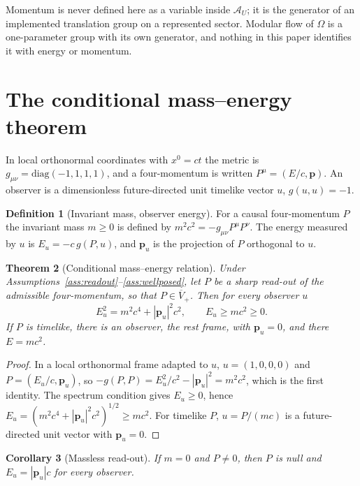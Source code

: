 \documentclass[12pt,a4paper]{article}
\newtheorem{theorem}{Theorem}[section]
\newtheorem{corollary}[theorem]{Corollary}
\theoremstyle{definition}
\newtheorem{definition}[theorem]{Definition}
\theoremstyle{remark}
\newcommand{\AU}{\mathcal{A}_U}
\newcommand{\Omegastate}{\Omega}
\begin{document}
Momentum is never defined here as a variable inside $\AU$; it is the generator of an implemented translation group on a represented sector. Modular flow of $\Omegastate$ is a one-parameter group with its own generator, and nothing in this paper identifies it with energy or momentum.

\section{The conditional mass--energy theorem}
\label{sec:theorem}

In local orthonormal coordinates with $x^0=ct$ the metric is $g_{\mu\nu}=\mathrm{diag}(-1,1,1,1)$, and a four-momentum is written $P^\mu=(E/c,\mathbf p)$. An observer is a dimensionless future-directed unit timelike vector $u$, $g(u,u)=-1$.

\begin{definition}[Invariant mass, observer energy]
\label{def:mass}
For a causal four-momentum $P$ the invariant mass $m\ge0$ is defined by $m^2c^2=-g_{\mu\nu}P^\mu P^\nu$. The energy measured by $u$ is $E_u=-c\,g(P,u)$, and $\mathbf p_u$ is the projection of $P$ orthogonal to $u$.
\end{definition}

\begin{theorem}[Conditional mass--energy relation]
\label{thm:mass-energy}
Under Assumptions~\ref{ass:readout}--\ref{ass:wellposed}, let $P$ be a sharp read-out of the admissible four-momentum, so that $P\in\overline V_+$. Then for every observer $u$
\begin{equation}
E_u^2=m^2c^4+|\mathbf p_u|^2c^2,\qquad E_u\ge mc^2\ge0 .
\end{equation}
If $P$ is timelike, there is an observer, the rest frame, with $\mathbf p_u=0$, and there $E=mc^2$.
\end{theorem}

\begin{proof}
In a local orthonormal frame adapted to $u$, $u=(1,0,0,0)$ and $P=(E_u/c,\mathbf p_u)$, so $-g(P,P)=E_u^2/c^2-|\mathbf p_u|^2=m^2c^2$, which is the first identity. The spectrum condition gives $E_u\ge0$, hence $E_u=(m^2c^4+|\mathbf p_u|^2c^2)^{1/2}\ge mc^2$. For timelike $P$, $u=P/(mc)$ is a future-directed unit vector with $\mathbf p_u=0$.
\end{proof}

\begin{corollary}[Massless read-out]
\label{cor:massless}
If $m=0$ and $P\neq0$, then $P$ is null and $E_u=|\mathbf p_u|c$ for every observer.
\end{corollary}
\end{document}
